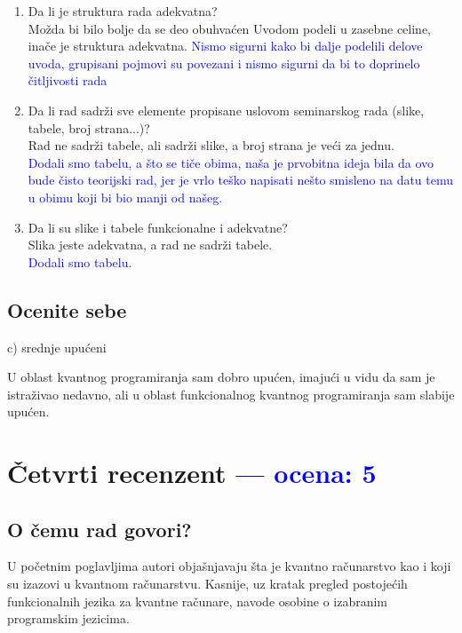 \documentclass[a4paper]{report}
\newcommand{\odgovor}[1]{\textcolor{blue}{#1}}
\begin{document}
\begin{enumerate}
\item Da li je struktura rada adekvatna?\\
Možda bi bilo bolje da se deo obuhvaćen Uvodom podeli u zasebne celine, inače je struktura adekvatna.
\odgovor{Nismo sigurni kako bi dalje podelili delove uvoda, grupisani pojmovi su povezani i nismo sigurni da bi to doprinelo čitljivosti rada}
\item Da li rad sadrži sve elemente propisane uslovom seminarskog rada (slike, tabele, broj strana...)?\\
Rad ne sadrži tabele, ali sadrži slike, a broj strana je veći za jednu.\\
\odgovor {Dodali smo tabelu, a što se tiče obima, naša je prvobitna ideja bila da ovo bude čisto teorijski rad, jer je vrlo teško napisati nešto smisleno na datu temu u obimu koji bi bio manji od našeg.}
\item Da li su slike i tabele funkcionalne i adekvatne?\\
Slika jeste adekvatna, a rad ne sadrži tabele.\\
\odgovor {Dodali smo tabelu.}
\end{enumerate}

\section{Ocenite sebe}
 c) srednje upućeni

U oblast kvantnog programiranja sam dobro upućen, imajući u vidu da sam je istraživao nedavno, ali u oblast funkcionalnog kvantnog programiranja sam slabije upućen.


\chapter{Četvrti recenzent \odgovor{--- ocena: 5 } }%

\section{O čemu rad govori?}
U početnim poglavljima autori objašnjavaju šta je kvantno računarstvo kao i koji su izazovi u kvantnom računarstvu. Kasnije, uz kratak pregled postojećih funkcionalnih jezika za kvantne računare, navode osobine o izabranim programskim jezicima.
\end{document}
